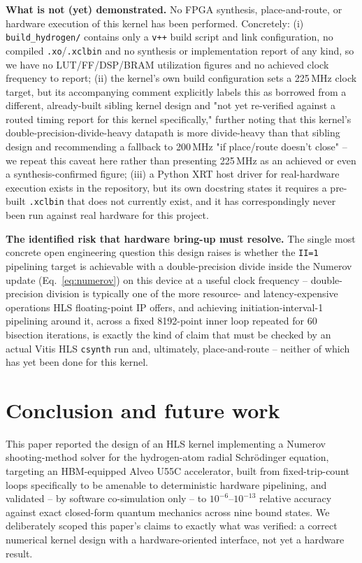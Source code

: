 \documentclass[pdflatex,sn-mathphys,Numbered]{sn-jnl}
\begin{document}
\textbf{What is not (yet) demonstrated.} No FPGA synthesis, place-and-route, or hardware execution of this kernel has been performed. Concretely: (i) \texttt{build\_hydrogen/} contains only a \texttt{v++} build script and link configuration, no compiled \texttt{.xo}/\texttt{.xclbin} and no synthesis or implementation report of any kind, so we have no LUT/FF/DSP/BRAM utilization figures and no achieved clock frequency to report; (ii) the kernel's own build configuration sets a 225\,MHz clock target, but its accompanying comment explicitly labels this as borrowed from a different, already-built sibling kernel design and "not yet re-verified against a routed timing report for this kernel specifically," further noting that this kernel's double-precision-divide-heavy datapath is more divide-heavy than that sibling design and recommending a fallback to 200\,MHz "if place/route doesn't close" -- we repeat this caveat here rather than presenting 225\,MHz as an achieved or even a synthesis-confirmed figure; (iii) a Python XRT host driver for real-hardware execution exists in the repository, but its own docstring states it requires a pre-built \texttt{.xclbin} that does not currently exist, and it has correspondingly never been run against real hardware for this project.

\textbf{The identified risk that hardware bring-up must resolve.} The single most concrete open engineering question this design raises is whether the \texttt{II=1} pipelining target is achievable with a double-precision divide inside the Numerov update (Eq.~\eqref{eq:numerov}) on this device at a useful clock frequency -- double-precision division is typically one of the more resource- and latency-expensive operations HLS floating-point IP offers, and achieving initiation-interval-1 pipelining around it, across a fixed 8192-point inner loop repeated for 60 bisection iterations, is exactly the kind of claim that must be checked by an actual Vitis HLS \texttt{csynth} run and, ultimately, place-and-route -- neither of which has yet been done for this kernel.

\section{Conclusion and future work}\label{sec:conclusion}

This paper reported the design of an HLS kernel implementing a Numerov shooting-method solver for the hydrogen-atom radial Schr\"odinger equation, targeting an HBM-equipped Alveo U55C accelerator, built from fixed-trip-count loops specifically to be amenable to deterministic hardware pipelining, and validated -- by software co-simulation only -- to $10^{-6}$--$10^{-13}$ relative accuracy against exact closed-form quantum mechanics across nine bound states. We deliberately scoped this paper's claims to exactly what was verified: a correct numerical kernel design with a hardware-oriented interface, not yet a hardware result.
\end{document}
